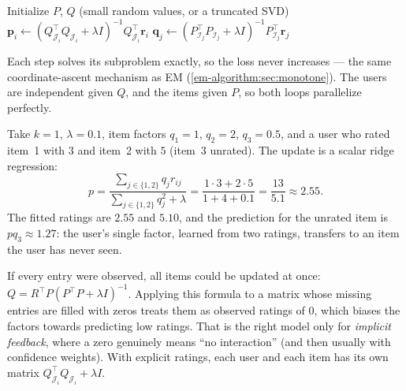 \begin{notechapter}
\begin{center}
\begin{minipage}{0.85\linewidth}
\begin{algorithm}[H]
\caption{Alternating least squares}
\begin{algorithmic}[1]
\State Initialize $P$, $Q$ (small random values, or a truncated SVD)
   \State $\mathbf p_i\leftarrow(Q_{\mathcal J_i}^\top Q_{\mathcal J_i} + \lambda I)^{-1}Q_{\mathcal J_i}^\top\mathbf r_i$ \EndFor
   \State $\mathbf q_j\leftarrow(P_{\mathcal I_j}^\top P_{\mathcal I_j} + \lambda I)^{-1}P_{\mathcal I_j}^\top\mathbf r_j$ \EndFor
\EndFor
\end{algorithmic}
\end{algorithm}
\end{minipage}
\end{center}

Each step solves its subproblem exactly, so the loss never increases --- the same
coordinate-ascent mechanism as EM (\cref{em-algorithm:sec:monotone}). The users are
independent given $Q$, and the items given $P$, so both loops parallelize perfectly.

\begin{example}
Take $k = 1$, $\lambda = 0.1$, item factors $q_1 = 1$, $q_2 = 2$, $q_3 = 0.5$, and a user who rated item~1
with $3$ and item~2 with $5$ (item~3 unrated). The update is a scalar ridge regression:
\[
  p = \frac{\sum_{j\in\{1,2\}}q_jr_{ij}}{\sum_{j\in\{1,2\}}q_j^2 + \lambda} = \frac{1\cdot3 + 2\cdot5}{1 + 4 + 0.1} = \frac{13}{5.1}\approx2.55 .
\]
The fitted ratings are $2.55$ and $5.10$, and the prediction for the unrated item is
$pq_3\approx1.27$: the user's single factor, learned from two ratings, transfers to an item the user
has never seen.
\end{example}

\begin{pitfall}
If every entry were observed, all items could be updated at once:
$Q = R^\top P(P^\top P + \lambda I)^{-1}$. Applying this formula to a matrix whose missing entries are
filled with zeros treats them as observed ratings of $0$, which biases the factors towards
predicting low ratings. That is the right model only for \emph{implicit feedback}, where a zero
genuinely means ``no interaction'' (and then usually with confidence weights). With explicit
ratings, each user and each item has its own matrix $Q_{\mathcal J_i}^\top Q_{\mathcal J_i} + \lambda I$.
\end{pitfall}


\end{notechapter}
